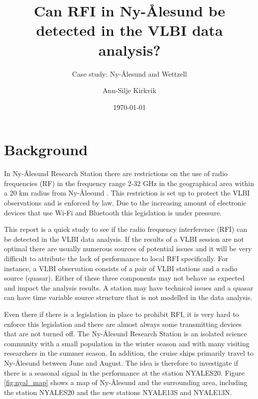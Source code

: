 \documentclass[twoside=semi,fontsize=12pt,paper=a4,titlepage=on]{kv_article}
\begin{document}
\title{Can RFI in Ny-Ålesund be detected in the VLBI data analysis?}
\subtitle{\vspace{1cm}Case study: Ny-Ålesund and Wettzell}
\author{Ann-Silje Kirkvik}
\date{\today}

\maketitle

\section{Background}
In Ny-Ålesund Research Station there are restrictions on the use of radio frequencies (RF) in the frequency range 2-32 GHz in the geographical area within a 20 km radius from Ny-Ålesund \cite{nyalesundresearch}. This restriction is set up to protect the VLBI observations and is enforced by law. Due to the increasing amount of electronic devices that use Wi-Fi and Bluetooth this legislation is under pressure.

This report is a quick study to see if the radio frequency interference (RFI) can be detected in the VLBI data analysis. If the results of a VLBI session are not optimal there are usually numerous sources of potential issues and it will be very difficult to attribute the lack of performance to local RFI specifically. For instance, a VLBI observation consists of a pair of VLBI stations and a radio source (quasar). Either of these three components may not behave as expected and impact the analysis results. A station may have technical issues and a quasar can have time variable source structure that is not modelled in the data analysis.

Even there if there is a legislation in place to prohibit RFI, it is very hard to enforce this legislation and there are almost always some transmitting devices that are not turned off. The Ny-Ålesund Research Station is an isolated science community with a small population in the winter season and with many visiting researchers in the summer season. In addition, the cruise ships primarily travel to Ny-Ålesund between June and August. The idea is therefore to investigate if there is a seasonal signal in the performance at the station NYALES20. Figure \ref{fig:nyal_map} shows a map of Ny-Ålesund and the surrounding area, including the station NYALES20 and the new stations NYALE13S and NYALE13N.
\end{document}
